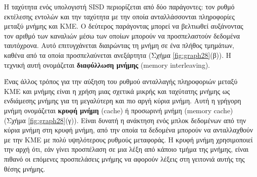 \documentclass[12pt,a4paper]{article}
\begin{document}
Η ταχύτητα ενός υπολογιστή \foreignlanguage{english}{SISD} περιορίζεται από δύο παράγοντες: τον ρυθμό
εκτέλεσης εντολών και την ταχύτητα με την οποία ανταλλάσσονται πληροφορίες μεταξύ
μνήμης και ΚΜΕ. Ο δεύτερος παράγοντας μπορεί να βελτιωθεί αυξάνοντας τον αριθμό
των καναλιών μέσω των οποίων μπορούν να προσπελαστούν δεδομένα ταυτόχρονα.
Αυτό επιτυγχάνεται διαιρώντας τη μνήμη σε ένα πλήθος τμημάτων, καθένα από τα
οποία προσπελαύνεται ανεξάρτητα {(}Σχήμα \ref{fig:graph28}(β){)}. Η τεχνική αυτή ονομάζεται
\textbf{διαφύλλωση μνήμης} (\foreignlanguage{english}{memory interleaving}).

Ένας άλλος τρόπος για την αύξηση του ρυθμού ανταλλαγής πληροφοριών μεταξύ
ΚΜΕ και μνήμης είναι η χρήση μιας σχετικά μικρής και ταχύτατης μνήμης ως
ενδιάμεσης μνήμης για τη μεγαλύτερη και πιο αργή κύρια μνήμη. Αυτή η γρήγορη
μνήμη ονομάζεται \textbf{κρυφή μνήμη} (\foreignlanguage{english}{cache}) ή προσωρινή μνήμη (\foreignlanguage{english}{memory cache}) {(}Σχήμα \ref{fig:graph28}(γ){)}. Είναι δυνατή η ανάκτηση
ενός μπλοκ δεδομένων από την κύρια μνήμη στη κρυφή μνήμη, από την οποία τα
δεδομένα μπορούν να ανταλλαχθούν με την ΚΜΕ με πολύ υψηλότερους ρυθμούς
μεταφοράς. Η κρυφή μνήμη χρησιμοποιεί την αρχή ότι, εάν γίνει προσπέλαση σε μια
λέξη από κάποιο τμήμα της μνήμης, είναι πιθανό οι επόμενες προσπελάσεις μνήμης
να αφορούν λέξεις στη γειτονιά αυτής της θέσης μνήμης.
\end{document}
